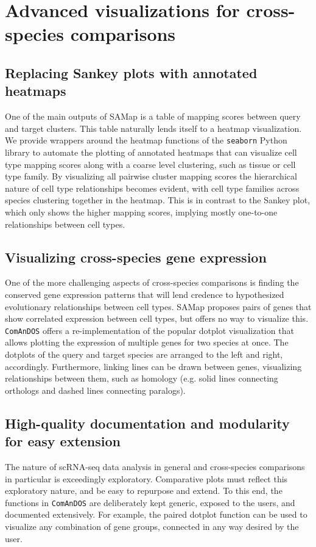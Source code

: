 \documentclass{article}
\begin{document}
\section{Advanced visualizations for cross-species comparisons}

\subsection{Replacing Sankey plots with annotated heatmaps}

One of the main outputs of SAMap is a table of mapping scores between query and target clusters.
This table naturally lends itself to a heatmap visualization. We provide wrappers around the heatmap
functions of the \texttt{seaborn} Python library \cite{bisong2019matplotlib} to automate the
plotting of annotated heatmaps that can visualize cell type mapping scores along with a coarse level
clustering, such as tissue or cell type family. By visualizing all pairwise cluster mapping scores
the hierarchical nature of cell type relationships becomes evident, with cell type families across
species clustering together in the heatmap. This is in contrast to the Sankey plot, which only shows
the higher mapping scores, implying mostly one-to-one relationships between cell types.

\subsection{Visualizing cross-species gene expression}

One of the more challenging aspects of cross-species comparisons is finding the conserved gene
expression patterns that will lend credence to hypothesized evolutionary relationships between cell
types. SAMap proposes pairs of genes that show correlated expression between cell types, but offers
no way to visualize this. \texttt{ComAnDOS} offers a re-implementation of the popular dotplot
visualization that allows plotting the expression of multiple genes for two species at once. The
dotplots of the query and target species are arranged to the left and right, accordingly.
Furthermore, linking lines can be drawn between genes, visualizing relationships between them, such
as homology (e.g. solid lines connecting orthologs and dashed lines connecting paralogs).

\subsection{High-quality documentation and modularity for easy extension}

The nature of scRNA-seq data analysis in general and cross-species comparisons in particular is
exceedingly exploratory. Comparative plots must reflect this exploratory nature, and be easy to
repurpose and extend. To this end, the functions in \texttt{ComAnDOS} are deliberately kept generic,
exposed to the users, and documented extensively. For example, the paired dotplot function can be
used to visualize any combination of gene groups, connected in any way desired by the user.





\end{document}
